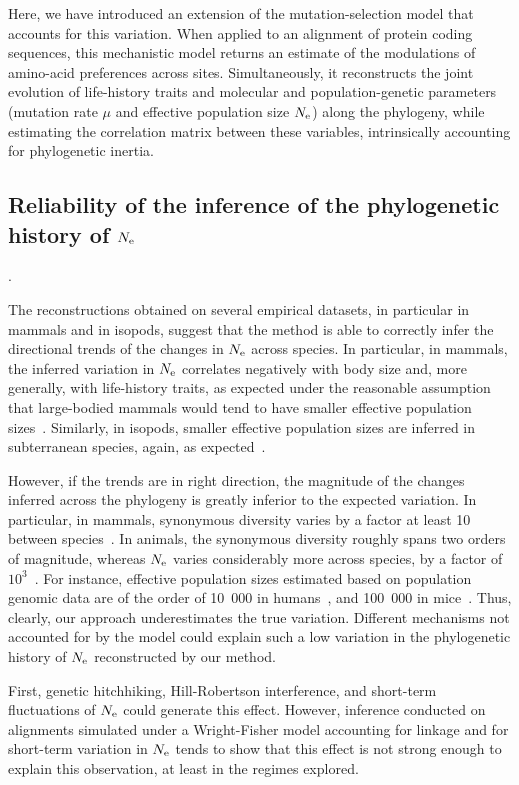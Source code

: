 \documentclass{MBE}
\begin{document}
	Here, we have introduced an extension of the mutation-selection model that accounts for this variation.
	When applied to an alignment of protein coding sequences, this mechanistic model returns an estimate of the modulations of amino-acid preferences across sites.
	Simultaneously, it reconstructs the joint evolution of life-history traits and molecular and population-genetic parameters (mutation rate $\mu$ and {effective population size} $N_{\text{e}}$) along the phylogeny, while estimating the correlation matrix between these variables, intrinsically accounting for phylogenetic inertia.

	\subsection{Reliability of the inference of the phylogenetic history of $N_{\text{e}}$}.

	The reconstructions obtained on several empirical datasets, in particular in mammals and in isopods, suggest that the method is able to correctly infer the directional trends of the changes in $N_{\text{e}}$ across species.
	In particular, in mammals, the inferred variation in $N_{\text{e}}$ correlates negatively with body size and, more generally, with life-history traits, as expected under the reasonable assumption that large-bodied mammals would tend to have smaller effective population sizes~\cite{Popadin2007,Lartillot2012,Nabholz2013,Figuet2017}.
	Similarly, in isopods, smaller effective population sizes are inferred in subterranean species, again, as expected~\citep{Capderrey2013}.

	However, if the trends are in right direction, the magnitude of the changes inferred across the phylogeny is greatly inferior to the expected variation.
	In particular, in mammals, {synonymous} diversity varies by a factor at least 10 between species~\citep{Galtier2016}.
	In animals, the {synonymous} diversity roughly spans two orders of magnitude, whereas $N_{\text{e}}$ varies considerably more across species, by a factor of $10^3$~\citep{Galtier2019}.
	For instance, effective population sizes estimated based on population genomic data are of the order of 10~000 in humans~\citep{Li2011}, and 100~000 in mice~\citep{Geraldes2008}.
	Thus, clearly, our approach underestimates the true variation.
	Different mechanisms not accounted for by the model could explain such a low variation in the phylogenetic history of $N_{\text{e}}$ reconstructed by our method.

	First, genetic hitchhiking, Hill-Robertson interference, and short-term fluctuations of $N_{\text{e}}$ could generate this effect.
	However, inference conducted on alignments simulated under a Wright-Fisher model accounting for linkage and for short-term variation in $N_{\text{e}}$ tends to show that this effect is not strong enough to explain this observation, at least in the regimes explored.
\end{document}
